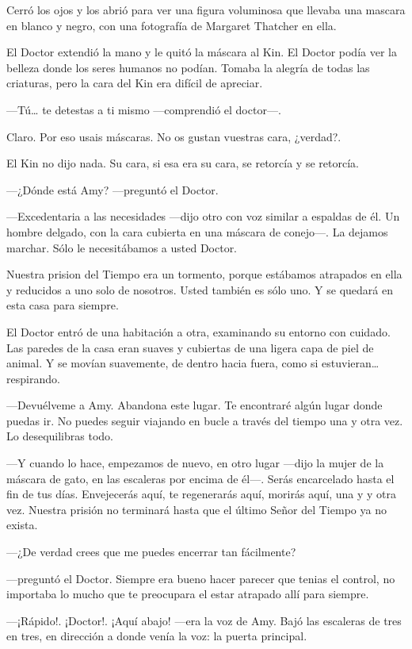 Cerró los ojos y los abrió para ver una figura voluminosa que llevaba una mascara en blanco y negro, con una fotografía de Margaret Thatcher en ella.

El Doctor extendió la mano y le quitó la máscara al Kin. El Doctor podía ver la belleza donde los seres humanos no podían. Tomaba la alegría de todas las criaturas, pero la cara del Kin era difícil de apreciar.

---Tú\ldots{} te detestas a ti mismo ---comprendió el doctor---.

Claro. Por eso usais máscaras. No os gustan vuestras cara, ¿verdad?.

El Kin no dijo nada. Su cara, si esa era su cara, se retorcía y se retorcía.

---¿Dónde está Amy? ---preguntó el Doctor.

---Excedentaria a las necesidades ---dijo otro con voz similar a espaldas de él. Un hombre delgado, con la cara cubierta en una máscara de conejo---. La dejamos marchar. Sólo le necesitábamos a usted Doctor.

Nuestra prision del Tiempo era un tormento, porque estábamos atrapados en ella y reducidos a uno solo de nosotros. Usted también es sólo uno. Y se quedará en esta casa para siempre.

El Doctor entró de una habitación a otra, examinando su entorno con cuidado. Las paredes de la casa eran suaves y cubiertas de una ligera capa de piel de animal. Y se movían suavemente, de dentro hacia fuera, como si estuvieran\ldots{} respirando.

---Devuélveme a Amy. Abandona este lugar. Te encontraré algún lugar donde puedas ir. No puedes seguir viajando en bucle a través del tiempo una y otra vez. Lo desequilibras todo.

---Y cuando lo hace, empezamos de nuevo, en otro lugar ---dijo la mujer de la máscara de gato, en las escaleras por encima de él---. Serás encarcelado hasta el fin de tus días. Envejecerás aquí, te regenerarás aquí, morirás aquí, una y y otra vez. Nuestra prisión no terminará hasta que el último Señor del Tiempo ya no exista.

---¿De verdad crees que me puedes encerrar tan fácilmente?

---preguntó el Doctor. Siempre era bueno hacer parecer que tenias el control, no importaba lo mucho que te preocupara el estar atrapado allí para siempre.

---¡Rápido!. ¡Doctor!. ¡Aquí abajo! ---era la voz de Amy. Bajó las escaleras de tres en tres, en dirección a donde venía la voz: la puerta principal.

